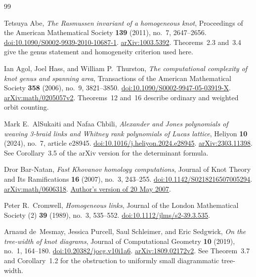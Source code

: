\begin{thebibliography}{99}

Tetsuya Abe,
\emph{The Rasmussen invariant of a homogeneous knot},
Proceedings of the American Mathematical Society
\textbf{139} (2011), no.~7, 2647--2656.
\href{https://doi.org/10.1090/S0002-9939-2010-10687-1}{doi:10.1090/S0002-9939-2010-10687-1}.
\href{https://arxiv.org/abs/1003.5392}{arXiv:1003.5392}.
Theorems~2.3 and~3.4 give the genus statement and homogeneity criterion used here.

Ian Agol, Joel Hass, and William P.~Thurston,
\emph{The computational complexity of knot genus and spanning area},
Transactions of the American Mathematical Society
\textbf{358} (2006), no.~9, 3821--3850.
\href{https://doi.org/10.1090/S0002-9947-05-03919-X}{doi:10.1090/S0002-9947-05-03919-X}.
\href{https://arxiv.org/abs/math/0205057v2}{arXiv:math/0205057v2}.
Theorems~12 and~16 describe ordinary and weighted orbit counting.

Mark E.~AlSukaiti and Nafaa Chbili,
\emph{Alexander and Jones polynomials of weaving 3-braid links and Whitney
rank polynomials of Lucas lattice},
Heliyon \textbf{10} (2024), no.~7, article e28945.
\href{https://doi.org/10.1016/j.heliyon.2024.e28945}{doi:10.1016/j.heliyon.2024.e28945}.
\href{https://arxiv.org/abs/2303.11398}{arXiv:2303.11398}.
See Corollary~3.5 of the arXiv version for the determinant formula.

Dror Bar-Natan,
\emph{Fast Khovanov homology computations},
Journal of Knot Theory and Its Ramifications
\textbf{16} (2007), no.~3, 243--255.
\href{https://doi.org/10.1142/S0218216507005294}{doi:10.1142/S0218216507005294}.
\href{https://arxiv.org/abs/math/0606318}{arXiv:math/0606318}.
\href{https://www.math.toronto.edu/drorbn/papers/FastKh/FastKh.pdf}{Author's version of 20 May 2007}.

Peter R.~Cromwell,
\emph{Homogeneous links},
Journal of the London Mathematical Society (2)
\textbf{39} (1989), no.~3, 535--552.
\href{https://doi.org/10.1112/jlms/s2-39.3.535}{doi:10.1112/jlms/s2-39.3.535}.

Arnaud de~Mesmay, Jessica Purcell, Saul Schleimer, and Eric Sedgwick,
\emph{On the tree-width of knot diagrams},
Journal of Computational Geometry
\textbf{10} (2019), no.~1, 164--180.
\href{https://doi.org/10.20382/jocg.v10i1a6}{doi:10.20382/jocg.v10i1a6}.
\href{https://arxiv.org/abs/1809.02172v2}{arXiv:1809.02172v2}.
See Theorem~3.7 and Corollary~1.2 for the obstruction to uniformly small
diagrammatic tree-width.


\end{thebibliography}
